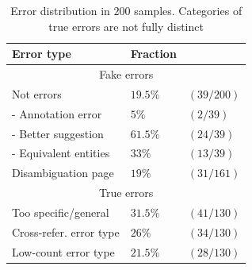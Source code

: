 \documentclass[11pt]{article}
\begin{document}
	\begin{table}[h]
		\begin{center}
			\begin{tabular}{|p{3.5cm}| ll |}
				\hline \bf Error type 		& \bf Fraction  	&\\ 
				\hline \multicolumn{3}{|c|}{Fake errors} \\
				\hline Not errors 			& $19.5\%$ 	& $(39/200)$  \\ 
				- Annotation error 			& $5\%$    	& $(2/39)$ \\ 
				- Better suggestion			& $61.5\%$ 	&$(24/39)$ \\
			    - Equivalent entities		& $ 33\%$ 	&$(13/39)$ \\ 
				Disambiguation page			& $19\%$   	&$(31/161)$ \\ 
				\hline \multicolumn{3}{|c|}{True errors} \\
				\hline	Too specific/general  	& $31.5\%$ 	&$(41/130)$ \\ 
				Cross-refer. error type		& $26\%$ 	&$(34/130)$ \\ 
				Low-count error type		& $21.5\%$ &$(28/130)$ \\
				\hline
			\end{tabular}
		\end{center}
		\caption{\label{tab:d} Error distribution in $200$ samples. Categories of true errors are not fully distinct}
	\end{table}
	
\end{document}
